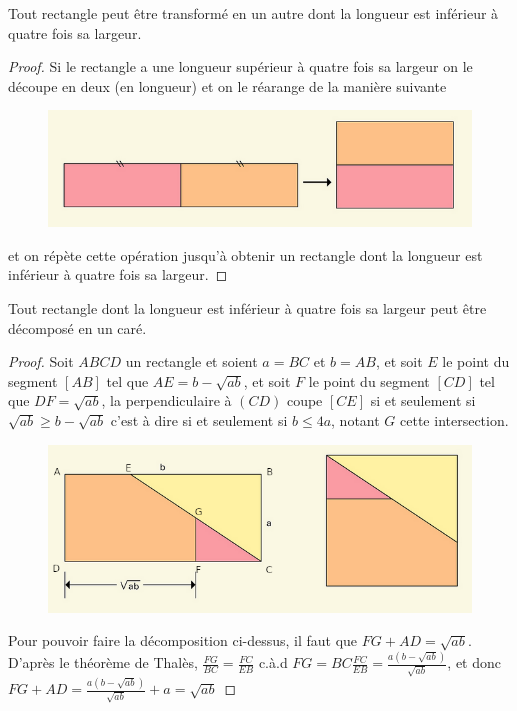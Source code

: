 \begin{li}
  Tout rectangle peut être transformé en un autre dont la longueur est inférieur à quatre fois sa largeur.
\end{li}
\newpage
\begin{proof}
  \hfill

  \noindent
  Si le rectangle a une longueur supérieur à quatre fois sa largeur on le découpe en deux (en longueur) et on le réarange de la manière suivante
      \begin{figure}[h]
          \centering
          \includegraphics[scale=0.6]{images/x2.png}

      \end{figure}

  \noindent
  et on répète cette opération jusqu'à obtenir un rectangle dont la longueur est inférieur à quatre fois sa largeur.
\end{proof}
\begin{li}
  Tout rectangle dont la longueur est inférieur à quatre fois sa largeur peut être décomposé en un caré.
\end{li}
\begin{proof}
Soit $ABCD$ un rectangle et soient $a=BC$ et $b=AB$, et soit $E$ le point du segment $[AB]$ tel que $AE = b-\sqrt{ab}$, et soit $F$ le point du segment $[CD]$ tel que $DF = \sqrt{ab}$, la perpendiculaire à $(CD)$ coupe $[CE]$ si et seulement si $\sqrt{ab} \ge b-\sqrt{ab}$ c'est à dire si et seulement si $b \le 4a$, notant $G$ cette intersection.
\begin{figure}[h]
    \centering
    \includegraphics[scale=0.6]{images/xx3.png}

\end{figure}

Pour pouvoir faire la décomposition ci-dessus, il faut que $FG +AD = \sqrt{ab}$. D'après le théorème de Thalès, $\frac{FG}{BC} = \frac{FC}{EB}$
c.à.d $FG = BC\frac{FC}{EB} = \frac{a(b-\sqrt{ab})}{\sqrt{ab}}$, et donc $FG +AD = \frac{a(b-\sqrt{ab})}{\sqrt{ab}} +a = \sqrt{ab}$
\end{proof}
